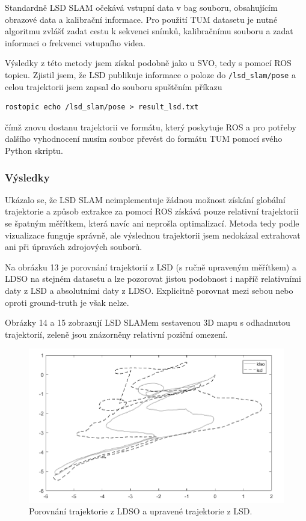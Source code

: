 \documentclass[12pt,a4paper]{article}
\begin{document}
Standardně LSD SLAM očekává vstupní data v bag souboru, obsahujícím obrazové data a kalibrační informace. Pro použití TUM datasetu je nutné algoritmu zvlášť zadat cestu k sekvenci snímků, kalibračnímu souboru a zadat informaci o frekvenci vstupního videa.

Výsledky z této metody jsem získal podobně jako u SVO, tedy s pomocí ROS topicu. Zjistil jsem, že LSD publikuje informace o poloze do \texttt{/lsd\_slam/pose} a celou trajektorii jsem zapsal do souboru spuštěním příkazu
\begin{verbatim}
rostopic echo /lsd_slam/pose > result_lsd.txt
\end{verbatim}
čímž znovu dostanu trajektorii ve formátu, který poskytuje ROS a pro potřeby dalšího vyhodnocení musím soubor převést do formátu TUM pomocí svého Python skriptu.

\subsubsection*{Výsledky}
Ukázalo se, že LSD SLAM neimplementuje žádnou možnost získání globální trajektorie a způsob extrakce za pomocí ROS získává pouze relativní trajektorii se špatným měřítkem, která navíc ani neprošla optimalizací. Metoda tedy podle vizualizace funguje správně, ale výslednou trajektorii jsem nedokázal extrahovat ani při úpravách zdrojových souborů.

Na obrázku 13 je porovnání trajektorií z LSD (s ručně upraveným měřítkem) a LDSO na stejném datasetu a lze pozorovat jistou podobnost i napříč relativními daty z LSD a absolutními daty z LDSO. Explicitně porovnat mezi sebou nebo oproti ground-truth je však nelze.

Obrázky 14 a 15 zobrazují LSD SLAMem sestavenou 3D mapu s odhadnutou trajektorií, zeleně jsou znázorněny relativní poziční omezení.

\begin{figure}[H]
\centering
\includegraphics[scale=0.63]{img/porov_lsd_ldso.png}
\caption{Porovnání trajektorie z LDSO a upravené trajektorie z LSD.}
\end{figure} 
\end{document}
